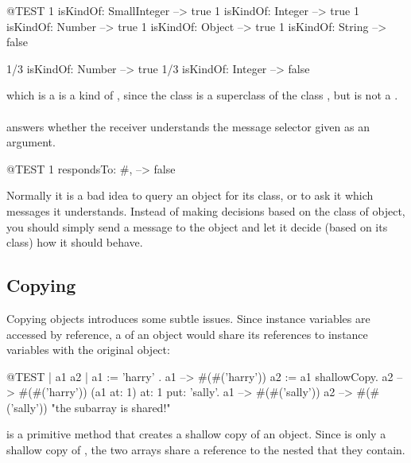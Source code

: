 \documentclass[a4paper,10pt,twoside]{book}
\begin{document}
\begin{code}{@TEST}
1 isKindOf: SmallInteger --> true
1 isKindOf: Integer          --> true
1 isKindOf: Number         --> true
1 isKindOf: Object           --> true
1 isKindOf: String            --> false

1/3 isKindOf: Number      --> true
1/3 isKindOf: Integer        --> false
\end{code}

 which is a  is a kind of , since the class  is a superclass of the class , but  is not a .

\paragraph{}
 answers whether the receiver understands the message selector given as an argument.

\begin{code}{@TEST}
1 respondsTo: #, --> false
\end{code}

Normally it is a bad idea to query an object for its class, or to ask it which messages it understands.
Instead of making decisions based on the class of object, you should simply send a message to the object and let it decide (\ie based on its class) how it should behave.

\subsection{Copying}

Copying objects introduces some subtle issues.
Since instance variables are accessed by reference, a  of an object would share its references to instance variables with the original object:

\begin{code}{@TEST | a1 a2 |}
a1 := { { 'harry' } }.
a1 --> #(#('harry'))
a2 := a1 shallowCopy.
a2 --> #(#('harry'))
(a1 at: 1) at: 1 put: 'sally'.
a1 --> #(#('sally'))
a2 --> #(#('sally'))    "the subarray is shared!"
\end{code}

 is a primitive method that creates a shallow copy of an object.
Since  is only a shallow copy of , the two arrays share a reference to the nested  that they contain.
\end{document}
